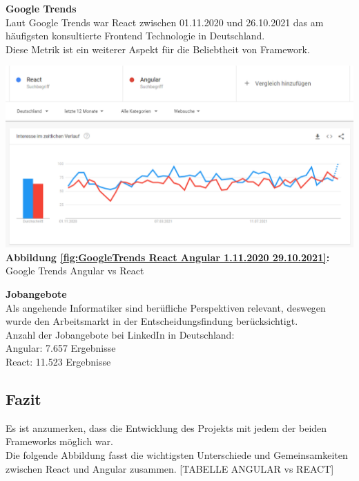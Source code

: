 \newpage

\begin{flushleft}
\textbf{Google Trends}\\
Laut Google Trends war React zwischen 01.11.2020 und 26.10.2021 das am häufigsten konsultierte Frontend Technologie in Deutschland.
\\
Diese Metrik ist ein weiterer Aspekt für die Beliebtheit von Framework.
\end{flushleft}

\begin{center}
  \includegraphics[scale=0.5]
  {sources/GoogleTrends React Angular 1.11.2020 29.10.2021}\label{fig:GoogleTrends React Angular 1.11.2020 29.10.2021}\\
  \textbf{Abbildung \autoref{fig:GoogleTrends React Angular 1.11.2020 29.10.2021}:} Google Trends Angular vs React
    {\cite{GO01}}
\end{center}

\begin{flushleft}
\textbf{Jobangebote}\\
Als angehende Informatiker sind berüfliche Perspektiven relevant, deswegen wurde den Arbeitsmarkt in der Entscheidungsfindung berücksichtigt.
\\
  Anzahl der Jobangebote bei LinkedIn in Deutschland:
  \\
  Angular: 7.657 Ergebnisse{\cite{LI1}}
  \\
  React: 11.523 Ergebnisse{\cite{LI2}}
\end{flushleft}

\subsection{Fazit}
Es ist anzumerken, dass die Entwicklung des Projekts mit jedem der beiden Frameworks möglich war.
\\
Die folgende Abbildung fasst die wichtigsten Unterschiede und Gemeinsamkeiten zwischen React und Angular zusammen.
[TABELLE ANGULAR vs REACT]

